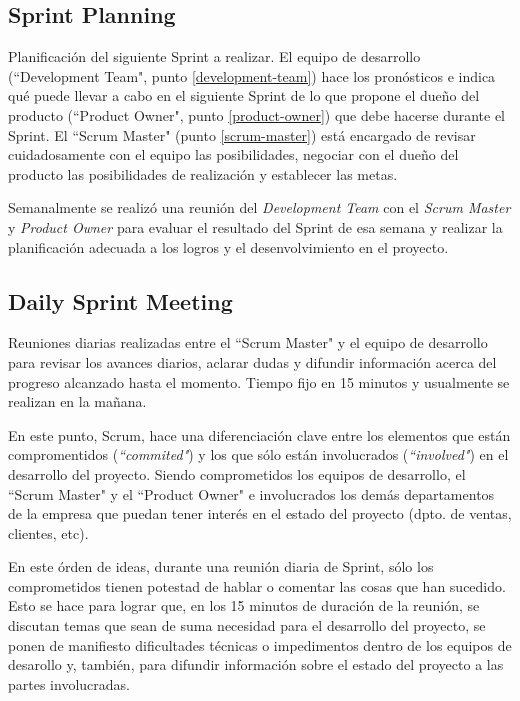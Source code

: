         \subsection{Sprint Planning}
        
        Planificación del siguiente Sprint a realizar. El equipo de desarrollo (``Development Team", punto \ref{development-team}) hace los pronósticos e indica qué puede llevar a cabo en el siguiente Sprint de lo que propone el dueño del producto (``Product Owner", punto \ref{product-owner}) que debe hacerse durante el Sprint. El ``Scrum Master" (punto \ref{scrum-master}) está encargado de revisar cuidadosamente con el equipo las posibilidades, negociar con el dueño del producto las posibilidades de realización y establecer las metas.
        
        Semanalmente se realizó una reunión del \textit{Development Team} con el \textit{Scrum Master} y \textit{Product Owner} para evaluar el resultado del Sprint de esa semana y realizar la planificación adecuada a los logros y el desenvolvimiento en el proyecto.
        
        \subsection{Daily Sprint Meeting}
        
        Reuniones diarias realizadas entre el ``Scrum Master" y el equipo de desarrollo para revisar los avances diarios, aclarar dudas y difundir información acerca del progreso alcanzado hasta el momento. Tiempo fijo en 15 minutos y usualmente se realizan en la mañana.
        
        En este punto, Scrum, hace una diferenciación clave entre los elementos que están compromentidos (\textit{``commited"}) y los que sólo están involucrados (\textit{``involved"}) en el desarrollo del proyecto. Siendo comprometidos los equipos de desarrollo, el ``Scrum Master" y el ``Product Owner" e involucrados los demás departamentos de la empresa que puedan tener interés en el estado del proyecto (dpto. de ventas, clientes, etc). 
        
        En este órden de ideas, durante una reunión diaria de Sprint, sólo los comprometidos tienen potestad de hablar o comentar las cosas que han sucedido. Esto se hace para lograr que, en los 15 minutos de duración de la reunión, se discutan temas que sean de suma necesidad para el desarrollo del proyecto, se ponen de manifiesto dificultades técnicas o impedimentos dentro de los equipos de desarollo y, también, para difundir información sobre el estado del proyecto a las partes involucradas.
        
